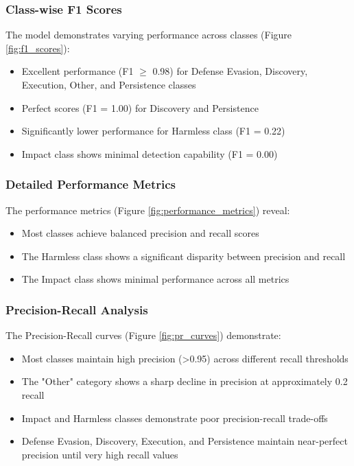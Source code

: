         \subsubsection{Class-wise F1 Scores}
        
            The model demonstrates varying performance across classes (Figure \ref{fig:f1_scores}):

            \begin{itemize}
                \item Excellent performance (F1 $\geq$ 0.98) for Defense Evasion, Discovery, Execution, Other, and Persistence classes
                \item Perfect scores (F1 = 1.00) for Discovery and Persistence
                \item Significantly lower performance for Harmless class (F1 = 0.22)
                \item Impact class shows minimal detection capability (F1 = 0.00)
            \end{itemize}

        \subsubsection{Detailed Performance Metrics}

            The performance metrics (Figure \ref{fig:performance_metrics}) reveal:

            \begin{itemize}
                \item Most classes achieve balanced precision and recall scores
                \item The Harmless class shows a significant disparity between precision and recall
                \item The Impact class shows minimal performance across all metrics
            \end{itemize}

        \subsubsection{Precision-Recall Analysis}

            The Precision-Recall curves (Figure \ref{fig:pr_curves}) demonstrate:

            \begin{itemize}
                \item Most classes maintain high precision (>0.95) across different recall thresholds
                \item The "Other" category shows a sharp decline in precision at approximately 0.2 recall
                \item Impact and Harmless classes demonstrate poor precision-recall trade-offs
                \item Defense Evasion, Discovery, Execution, and Persistence maintain near-perfect precision until very high recall values
            \end{itemize}

